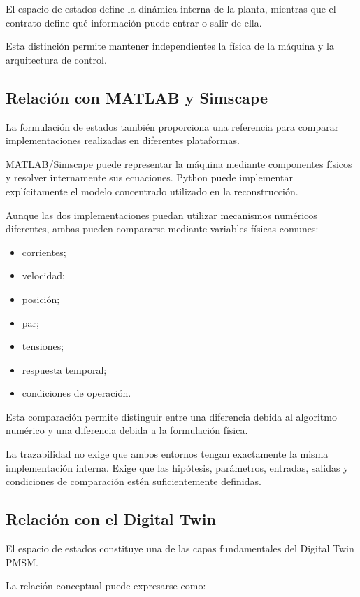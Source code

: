 El espacio de estados define la dinámica interna de la planta, mientras que el contrato define qué información puede entrar o salir de ella.

Esta distinción permite mantener independientes la física de la máquina y la arquitectura de control.

\subsection{Relación con MATLAB y Simscape}

La formulación de estados también proporciona una referencia para comparar implementaciones realizadas en diferentes plataformas.

MATLAB/Simscape puede representar la máquina mediante componentes físicos y resolver internamente sus ecuaciones. Python puede implementar explícitamente el modelo concentrado utilizado en la reconstrucción.

Aunque las dos implementaciones puedan utilizar mecanismos numéricos diferentes, ambas pueden compararse mediante variables físicas comunes:

\begin{itemize}
    \item corrientes;
    \item velocidad;
    \item posición;
    \item par;
    \item tensiones;
    \item respuesta temporal;
    \item condiciones de operación.
\end{itemize}

Esta comparación permite distinguir entre una diferencia debida al algoritmo numérico y una diferencia debida a la formulación física.

La trazabilidad no exige que ambos entornos tengan exactamente la misma implementación interna. Exige que las hipótesis, parámetros, entradas, salidas y condiciones de comparación estén suficientemente definidas.

\subsection{Relación con el Digital Twin}

El espacio de estados constituye una de las capas fundamentales del Digital Twin PMSM.

La relación conceptual puede expresarse como:


